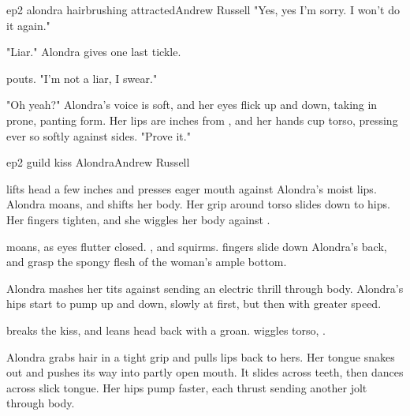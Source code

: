 \documentclass{book}
\begin{document}
\begin{childnode}{ep2 alondra hairbrushing attracted}{Andrew Russell}
    "Yes, yes I'm sorry. I won't do it again."

    "Liar." Alondra gives \name{} one last tickle.

    \name{} pouts. "I'm not a liar, I swear."

    "Oh yeah?" Alondra's voice is soft, and her eyes flick up and down, taking in \names{} prone, panting form. Her lips are inches from \names{}, and her hands cup \names{} torso, pressing ever so 
    softly against \names{} sides. "Prove it."



\end{childnode}

\begin{childnode}{ep2 guild kiss Alondra}{Andrew Russell}



    \name{} lifts \hisher{} head a few inches and presses \hisher{} eager mouth against Alondra's moist lips. Alondra moans, and shifts her body. Her grip around \names{} torso slides down to \hisher{} 
    hips. Her fingers tighten, and she wiggles her body against \names{}.

    \name{} moans, as \hisher{} eyes flutter closed. \HisHer{} , and \heshe{} squirms. \HisHer{} fingers slide down Alondra's back, and grasp the spongy flesh of the woman's ample bottom. 

    Alondra mashes her tits against \names{}  sending an electric thrill through \names{} body. Alondra's hips start to pump up and down, slowly at first, but then with greater speed. 

    \name{} breaks the kiss, and leans \hisher{} head back with a groan. \HeShe{} wiggles \hisher{} torso, \hisher{} .

    Alondra grabs \names{} hair in a tight grip and pulls \hisher{} lips back to hers. Her tongue snakes out and pushes its way into \names{} partly open mouth. It slides across \names{} teeth, then dances across \hisher{} slick tongue. Her hips pump
    faster, each thrust sending another jolt through \names{} body.


\end{childnode}
\end{document}
